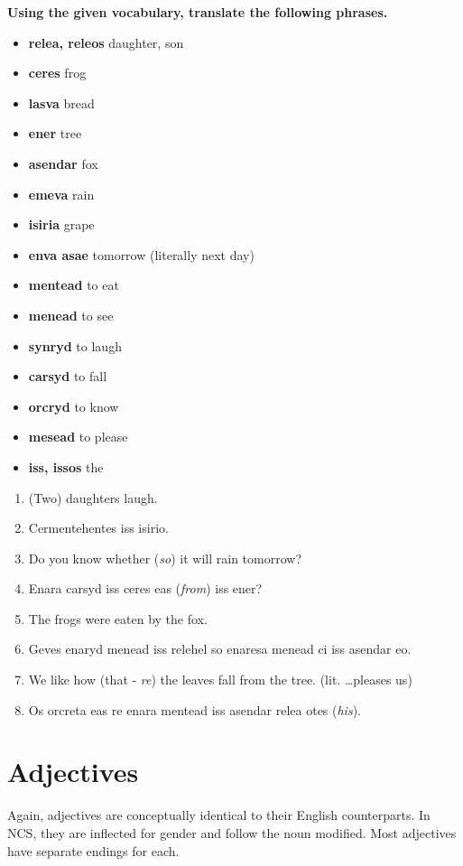 \textbf{Using the given vocabulary, translate the following phrases.}

\begin{itemize}
  \item \textbf{relea, releos} daughter, son
  \item \textbf{ceres} frog
  \item \textbf{lasva} bread
  \item \textbf{ener} tree
  \item \textbf{asendar} fox
  \item \textbf{emeva} rain
  \item \textbf{isiria} grape
  \item \textbf{enva asae} tomorrow (literally next day)
  \item \textbf{mentead} to eat
  \item \textbf{menead} to see
  \item \textbf{synryd} to laugh
  \item \textbf{carsyd} to fall
  \item \textbf{orcryd} to know
  \item \textbf{mesead} to please
  \item \textbf{iss, issos} the
\end{itemize}
\begin{enumerate}
  \item (Two) daughters laugh.
  \item Cermentehentes iss isirio.
  \item Do you know whether (\emph{so}) it will rain tomorrow?
  \item Enara carsyd iss ceres eas (\emph{from}) iss ener?
  \item The frogs were eaten by the fox.
  \item Geves enaryd menead iss relehel so enaresa menead ci iss asendar eo.
  \item We like how (that - \emph{re}) the leaves fall from the tree. (lit. \ldots pleases us)
  \item Os orcreta eas re enara mentead iss asendar relea otes (\emph{his}).
\end{enumerate}

\section{Adjectives}

Again, adjectives are conceptually identical to their English counterparts. In NCS, they are inflected for gender and follow the noun modified. Most adjectives have separate endings for each. \\

